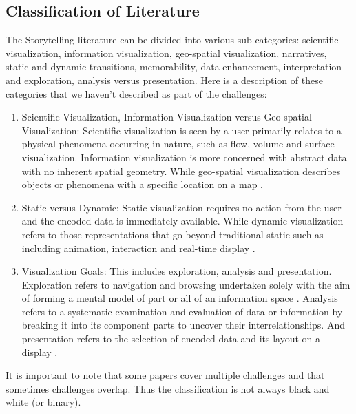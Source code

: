 \documentclass{egpubl}
\begin{document}
\subsection{Classification of Literature}
The Storytelling literature can be divided into various sub-categories: scientific visualization, information visualization, geo-spatial visualization, narratives, static and dynamic transitions, memorability, data enhancement, interpretation and exploration, analysis versus presentation. Here is a description of these categories that we haven't described as part of the challenges:
\begin{enumerate}
	\item Scientific Visualization, Information Visualization versus Geo-spatial Visualization: Scientific visualization is seen by a user primarily relates to a physical phenomena occurring in nature, such as flow, volume and surface visualization. Information visualization is more concerned with abstract data with no inherent spatial geometry. While geo-spatial visualization describes objects or phenomena with a specific location on a map \cite{spence2007}.
	\item Static versus Dynamic: Static visualization requires no action from the user and the encoded data is immediately available. While dynamic visualization refers to those representations that go beyond traditional static such as including animation, interaction and real-time display \cite{spence2007}.
	\item Visualization Goals: This includes exploration, analysis and presentation. Exploration refers to navigation and browsing undertaken solely with the aim of forming a mental model of part or all of an information space \cite{spence2007}. Analysis refers to a systematic examination and evaluation of data or information by breaking it into its component parts to uncover their interrelationships. And presentation refers to the selection of encoded data and its layout on a display \cite{spence2007}.
\end{enumerate}

It is important to note that some papers cover multiple challenges and that sometimes challenges overlap. Thus the classification is not always black and white (or binary).
\end{document}
